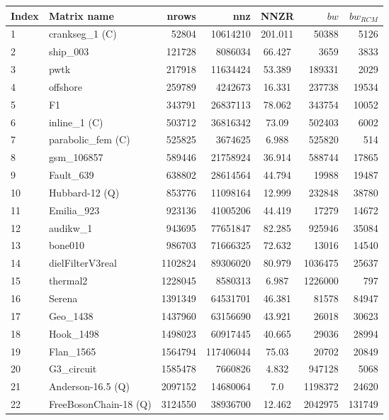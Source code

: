 \begin{tabular}{|l|l|r|r|S[round-mode=places,round-precision=2]|r|r|}
\toprule
{Index} & {Matrix name} &  {\acrshort{nrows}} & {\acrshort{nnz}} & {\acrshort{NNZR}}  & {$bw$} & {$bw_{RCM}$} \\
\midrule
{1}& {crankseg\_1 (C)}	& 52804	& 10614210	& 201.011	& 50388	& 5126	\\
{2}& {ship\_003}	& 121728	& 8086034	& 66.427	& 3659	& 3833	\\
{3}& {pwtk}	& 217918	& 11634424	& 53.389	& 189331	& 2029	\\
{4}& {offshore}	& 259789	& 4242673	& 16.331	& 237738	& 19534	\\
{5}& {F1}	& 343791	& 26837113	& 78.062	& 343754	& 10052	\\
{6}& {inline\_1 (C)}	& 503712	& 36816342	& 73.09	& 502403	& 6002	\\
{7}& {parabolic\_fem (C)}	& 525825	& 3674625	& 6.988	& 525820	& 514	\\
{8}& {gsm\_106857}	& 589446	& 21758924	& 36.914	& 588744	& 17865	\\
{9}& {Fault\_639}	& 638802	& 28614564	& 44.794	& 19988	& 19487	\\
{10}& {Hubbard-12 (Q)}	& 853776	& 11098164	& 12.999	& 232848	& 38780	\\
{11}& {Emilia\_923}	& 923136	& 41005206	& 44.419	& 17279	& 14672	\\
{12}& {audikw\_1}	& 943695	& 77651847	& 82.285	& 925946	& 35084	\\
{13}& {bone010}	& 986703	& 71666325	& 72.632	& 13016	& 14540	\\
{14}& {dielFilterV3real}	& 1102824	& 89306020	& 80.979	& 1036475	& 25637	\\
{15}& {thermal2}	& 1228045	& 8580313	& 6.987	& 1226000	& 797	\\
{16}& {Serena}	& 1391349	& 64531701	& 46.381	& 81578	& 84947	\\
{17}& {Geo\_1438}	& 1437960	& 63156690	& 43.921	& 26018	& 30623	\\
{18}& {Hook\_1498}	& 1498023	& 60917445	& 40.665	& 29036	& 28994	\\
{19}& {Flan\_1565}	& 1564794	& 117406044	& 75.03	& 20702	& 20849	\\
{20}& {G3\_circuit}	& 1585478	& 7660826	& 4.832	& 947128	& 5068	\\
{21}& {Anderson-16.5 (Q)}	& 2097152	& 14680064	& 7.0	& 1198372	& 24620	\\
{22}& {FreeBosonChain-18 (Q)}	& 3124550	& 38936700	& 12.462	& 2042975	& 131749	\\

\end{tabular}
